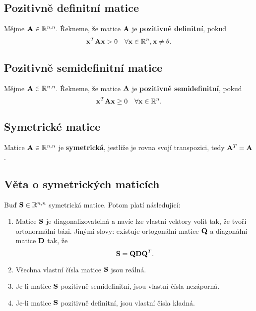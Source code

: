 \subsection*{Pozitivně definitní matice}

Mějme $\mathbf{A} \in \mathbb{R}^{n,n}$. Řekneme, že matice $\mathbf{A}$ je \textbf{pozitivně
	definitní}, pokud
\[ \mathbf{x}^T \mathbf{A} \mathbf{x} > 0 \quad \forall \mathbf{x} \in \mathbb{R}^{n}, \mathbf{x} \neq \theta. \]

\subsection*{Pozitivně semidefinitní matice}

Mějme $\mathbf{A} \in \mathbb{R}^{n,n}$. Řekneme, že matice $\mathbf{A}$ je \textbf{pozitivně
	semidefinitní}, pokud
\[ \mathbf{x}^T \mathbf{A} \mathbf{x} \geq 0 \quad \forall \mathbf{x} \in \mathbb{R}^{n}. \]

\subsection*{Symetrické matice}

Matice $\mathbf{A} \in \mathbb{R}^{n,n}$ je \textbf{symetrická}, jestliže je rovna svojí
transpozici, tedy $\mathbf{A}^T = \mathbf{A}$.

\subsection*{Věta o symetrických maticích}

Buď $\mathbf{S} \in \mathbb{R}^{n,n}$ symetrická matice. Potom platí následující:
\begin{enumerate}
	\item Matice $\mathbf{S}$ je diagonalizovatelná a navíc lze vlastní vektory volit tak, že
	      tvoří ortonormální bázi. Jinými slovy: existuje ortogonální matice $\mathbf{Q}$ a
	      diagonální matice $\mathbf{D}$ tak, že
	      \[ \mathbf{S} = \mathbf{Q}\mathbf{D}\mathbf{Q}^T. \]
	\item Všechna vlastní čísla matice $\mathbf{S}$ jsou reálná.
	\item Je-li matice $\mathbf{S}$ pozitivně semidefinitní, jsou vlastní čísla nezáporná.
	\item Je-li matice $\mathbf{S}$ pozitivně definitní, jsou vlastní čísla kladná.
\end{enumerate}

\pagebreak